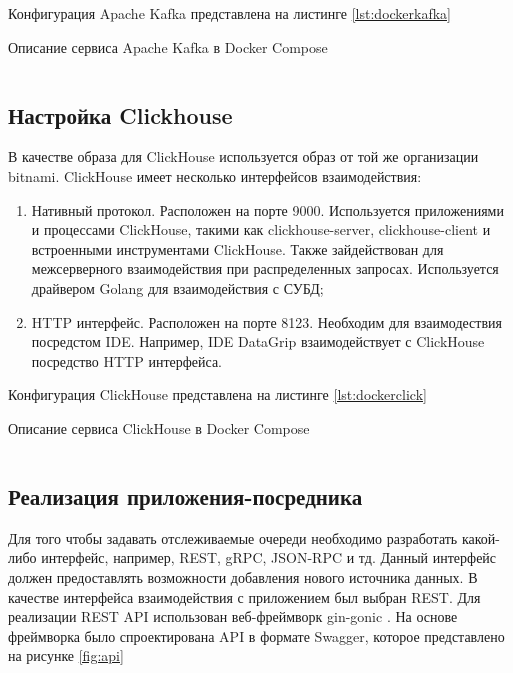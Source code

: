 \documentclass[14pt, russian]{scrartcl}
\begin{document}
Конфигурация Apache Kafka представлена на листинге \ref{lst:dockerkafka}

\begin{listing}[H]
	\caption{Описание сервиса Apache Kafka в Docker Compose}
	\label{lst:dockerkafka}
	\inputminted[style=bw, frame=single,fontsize = \footnotesize, linenos=false, xleftmargin = 1.5em]{yaml}{./listings/kafka.yml}
\end{listing}


\subsection{Настройка Clickhouse}

В качестве образа для ClickHouse используется образ от той же организации bitnami.
ClickHouse имеет несколько интерфейсов взаимодействия:
\begin{enumerate}
	\item Нативный протокол. Расположен на порте 9000. Используется приложениями и процессами ClickHouse, такими как clickhouse-server, clickhouse-client и встроенными инструментами ClickHouse. Также зайдействован для межсерверного взаимодействия при распределенных запросах.
	      Используется драйвером Golang для взаимодействия с СУБД;
	\item HTTP интерфейс. Расположен на порте 8123. Необходим для взаимодествия посредстом IDE. Например,
	      IDE DataGrip взаимодействует с ClickHouse посредство HTTP интерфейса.
\end{enumerate}

Конфигурация ClickHouse представлена на листинге \ref{lst:dockerclick}

\begin{listing}[H]
	\caption{Описание сервиса ClickHouse в Docker Compose}
	\label{lst:dockerclick}
	\inputminted[style=bw, frame=single,fontsize = \footnotesize, linenos=false, xleftmargin = 1.5em]{yaml}{./listings/clickhouse.yml}
\end{listing}

\subsection{Реализация приложения-посредника}

Для того чтобы задавать отслеживаемые очереди необходимо
разработать какой-либо интерфейс, например, REST, gRPC, JSON-RPC и тд.
Данный интерфейс должен предоставлять возможности добавления нового
источника данных. В качестве интерфейса взаимодействия
с приложением был выбран REST. Для реализации REST API использован
веб-фреймворк gin-gonic \cite{GinGonic}. На основе фреймворка
было спроектирована API в формате Swagger, которое представлено на
рисунке \ref{fig:api}
\end{document}
